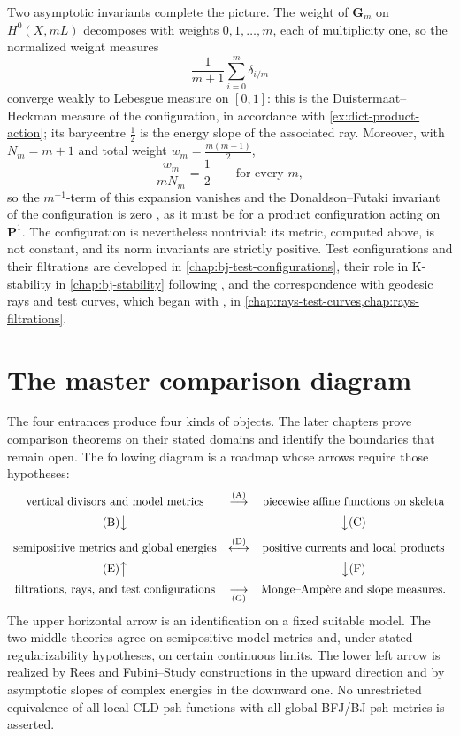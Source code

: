 Two asymptotic invariants complete the picture.  The weight of
$\mathbf G_m$ on $H^0(X,mL)$ decomposes with weights $0,1,\ldots,m$, each of
multiplicity one, so the normalized weight measures
\[
   \frac{1}{m+1}\sum_{i=0}^m\delta_{i/m}
\]
converge weakly to Lebesgue measure on $[0,1]$: this is the
Duistermaat--Heckman measure of the configuration, in accordance with
\cref{ex:dict-product-action}; its barycentre $\tfrac12$ is the energy slope
of the associated ray.  Moreover, with $N_m=m+1$ and total weight
$w_m=\tfrac{m(m+1)}2$,
\[
    \frac{w_m}{mN_m}=\frac12
    \qquad\text{for every }m ,
\]
so the $m^{-1}$-term of this expansion vanishes and the Donaldson--Futaki
invariant of the configuration is zero \cite{BHJ17}, as it must be for a
product configuration acting on $\mathbf P^1$.  The configuration is
nevertheless nontrivial: its metric, computed above, is not constant, and
its norm invariants are strictly positive.  Test configurations and their
filtrations are developed in \cref{chap:bj-test-configurations}, their role
in K-stability in \cref{chap:bj-stability} following
\cite{Tia97,Don02,BHJ17}, and the correspondence with geodesic rays and
test curves, which began with \cite{RWN14}, in
\cref{chap:rays-test-curves,chap:rays-filtrations}.

\section{The master comparison diagram}
\label{sec:ch01-master-diagram}

The four entrances produce four kinds of objects.  The later chapters prove
comparison theorems on their stated domains and identify the boundaries
that remain open.  The following diagram is a roadmap whose arrows require
those hypotheses:
{\small
\[
\begin{array}{ccc}
 \text{vertical divisors and model metrics}
   &\overset{\textup{(A)}}{\longrightarrow}& \text{piecewise affine functions on skeleta}\\[2mm]
 \textup{(B)}\big\downarrow && \big\downarrow\textup{(C)}\\[2mm]
 \text{semipositive metrics and global energies}
   &\overset{\textup{(D)}}{\longleftrightarrow}& \text{positive currents and local products}\\[2mm]
 \textup{(E)}\big\uparrow && \big\downarrow\textup{(F)}\\[2mm]
 \text{filtrations, rays, and test configurations}
   &\underset{\textup{(G)}}{\longrightarrow}& \text{Monge--Amp\`ere and slope measures}.
\end{array}
\]
}
The upper horizontal arrow is an identification on a fixed suitable model.
The two middle theories agree on semipositive model metrics and, under stated
regularizability hypotheses, on certain continuous limits.  The lower left
arrow is realized by Rees and Fubini--Study constructions in the upward
direction and by asymptotic slopes of complex energies in the downward one.
No unrestricted equivalence of all local CLD-psh functions
with all global BFJ/BJ-psh metrics is asserted.


